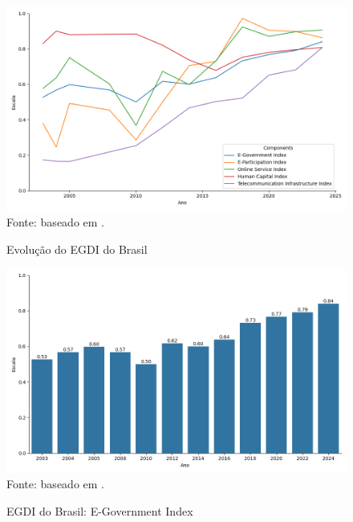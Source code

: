 \begin{figure}[H]
    \centering
    \caption{Evolução do EGDI do Brasil}
    \includegraphics[width=1\linewidth]{figuras/egdi/lineplot_egdi_brasil.png}
    \label{fig:lineplot_egdi_brasil}
    \footnotesize{Fonte: baseado em \cite{ONU_edgi_mapa}.}
\end{figure}

\begin{figure}[H]
    \centering
    \caption{EGDI do Brasil: E-Government Index}
    \includegraphics[width=1\linewidth]{figuras/egdi/egdi_brasil_egov.png}
    \label{fig:egdi_brasil_egov}
    \footnotesize{Fonte: baseado em \cite{ONU_edgi_mapa}.}
\end{figure}

